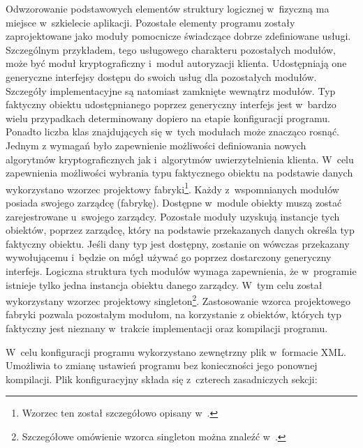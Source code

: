 Odwzorowanie podstawowych elementów struktury logicznej w~fizyczną ma
miejsce w~szkielecie aplikacji. Pozostałe elementy programu zostały
zaprojektowane jako moduły pomocnicze świadczące dobrze zdefiniowane
usługi. Szczególnym przykładem, tego usługowego charakteru pozostałych
modułów, może być moduł kryptograficzny i~moduł autoryzacji
klienta. Udostępniają one generyczne interfejsy dostępu do swoich
usług dla pozostałych modułów. Szczegóły implementacyjne są natomiast
zamknięte wewnątrz modułów. Typ faktyczny obiektu udostępnianego
poprzez generyczny interfejs jest w~bardzo wielu przypadkach
determinowany dopiero na etapie konfiguracji programu. Ponadto liczba
klas znajdujących się w~tych modułach może znacząco rosnąć. Jednym z
wymagań było zapewnienie możliwości definiowania nowych algorytmów
kryptograficznych jak i~algorytmów uwierzytelnienia klienta. W~celu
zapewnienia możliwości wybrania typu faktycznego obiektu na podstawie
danych wykorzystano wzorzec projektowy fabryki\footnote{Wzorzec ten
  został szczegółowo opisany w~\cite[101-109]{book:wzorce}.}.  Każdy
z~wspomnianych modułów posiada swojego zarządcę (fabrykę). Dostępne
w~module obiekty muszą zostać zarejestrowane u~swojego
zarządcy. Pozostałe moduły uzyskują instancje tych obiektów, poprzez
zarządcę, który na podstawie przekazanych danych określa typ faktyczny
obiektu. Jeśli dany typ jest dostępny, zostanie on wówczas przekazany
wywołującemu i~będzie on mógł używać go poprzez dostarczony generyczny
interfejs. Logiczna struktura tych modułów wymaga zapewnienia, że
w~programie istnieje tylko jedna instancja obiektu danego
zarządcy. W~tym celu został wykorzystany wzorzec projektowy
singleton\footnote{Szczegółowe omówienie wzorca singleton można
  znaleźć w~\cite[130-138]{book:wzorce}.}. Zastosowanie wzorca
projektowego fabryki pozwala pozostałym modułom, na korzystanie z
obiektów, których typ faktyczny jest nieznany w~trakcie implementacji
oraz kompilacji programu.

W~celu konfiguracji programu wykorzystano zewnętrzny plik w~formacie
XML. Umożliwia to zmianę ustawień programu bez konieczności jego
ponownej kompilacji. Plik konfiguracyjny składa się z~czterech
zasadniczych sekcji:

